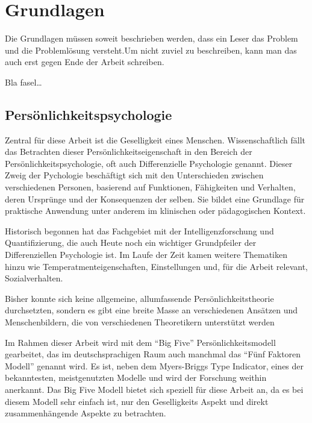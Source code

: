 
\chapter{Grundlagen}
\label{ch:Grundlagen}
Die Grundlagen müssen soweit beschrieben
werden, dass ein Leser das Problem und
die Problemlösung  versteht.Um nicht zuviel 
zu beschreiben, kann man das auch erst gegen 
Ende der Arbeit schreiben.

Bla fasel\ldots

\section{Persönlichkeitspsychologie}
\label{ch:Grundlagen:sec:Abschnitt1}

Zentral für diese Arbeit ist die Geselligkeit eines Menschen.
Wissenschaftlich fällt das Betrachten dieser Persönlichkeitseigenschaft in den Bereich der Persönlichkeitspsychologie,
oft auch Differenzielle Psychologie genannt. 
Dieser Zweig der Pychologie beschäftigt sich mit den Unterschieden zwischen verschiedenen Personen, 
basierend auf Funktionen, Fähigkeiten und Verhalten, deren Ursprünge und der Konsequenzen der selben.
Sie bildet eine Grundlage für praktische Anwendung unter anderem im klinischen oder pädagogischen Kontext.
\par

Historisch begonnen hat das Fachgebiet mit der Intelligenzforschung und Quantifizierung, 
die auch Heute noch ein wichtiger Grundpfeiler der Differenziellen Psychologie ist.
Im Laufe der Zeit kamen weitere Thematiken hinzu wie Temperatmenteigenschaften, Einstellungen und, für die Arbeit relevant, Sozialverhalten.
\par

Bisher konnte sich keine allgemeine, allumfassende Persönlichkeitstheorie durchsetzten, sondern es gibt eine breite Masse an verschiedenen Ansätzen und Menschenbildern, die von verschiedenen Theoretikern unterstützt werden
Im Rahmen dieser Arbeit wird mit dem "`Big Five"' Persönlichkeitsmodell gearbeitet, das im deutschsprachigen Raum auch manchmal das "`Fünf Faktoren Modell"' genannt wird.
Es ist, neben dem Myers-Briggs Type Indicator, eines der bekanntesten, meistgenutzten Modelle und wird der Forschung weithin anerkannt.
Das Big Five Modell bietet sich speziell für diese Arbeit an, da es bei diesem Modell sehr einfach ist, nur den Geselligkeits Aspekt und direkt zusammenhängende Aspekte zu betrachten.


